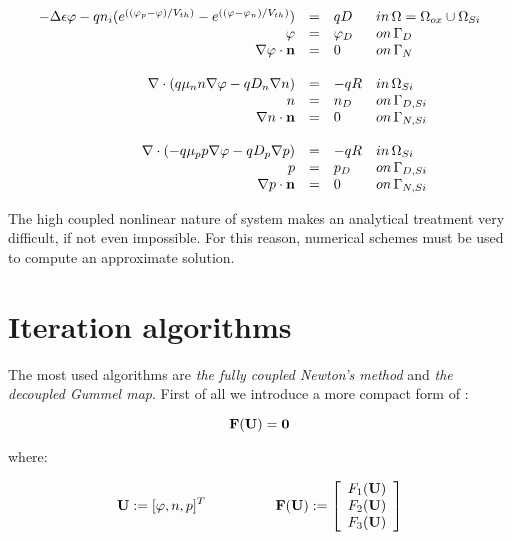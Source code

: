 \begin{equation}
\label{eq: system closed}
\begin{array}{rcll}
- \Delta \epsilon \varphi - qn_i(e^{((\varphi_p-\varphi)/V_{th})}-e^{((\varphi-\varphi_n)/V_{th})}) & =  & qD & in \, \Omega = \Omega_{ox} \cup \Omega_{Si}\\
\varphi & = & \varphi_D & on \, \Gamma_D \\
\nabla \varphi \cdot \mathbf{n} & = & 0 & on \, \Gamma_N 
\\
\\
\nabla \cdot ( q\mu_n n \nabla \varphi - qD_n \nabla n ) & = & - qR & in \, \Omega_{Si}\\
n & = & n_D & on \, \Gamma_{D,Si} \\
\nabla n \cdot \mathbf{n} & = & 0 & on \, \Gamma_{N,Si}
\\
\\
\nabla \cdot (- q\mu_p p \nabla \varphi - qD_p \nabla p )& = & -qR& in \, \Omega_{Si}\\
p & = & p_D & on \, \Gamma_{D,Si} \\
\nabla p \cdot \mathbf{n} & = & 0 & on \, \Gamma_{N,Si}
\end{array}
\end{equation}

The high coupled nonlinear nature of system	 makes an analytical treatment very difficult, if not even impossible. For this reason, numerical schemes must be used to compute an approximate solution. 


\section{Iteration algorithms}

 The most used algorithms are \textit{the fully coupled Newton's method} and \textit{the decoupled Gummel map}. First of all we introduce a more compact form of :

\begin{equation}
\label{eq: abstract problem fully}
\mathbf{F(U)}=\mathbf{0}
\end{equation}

where:

\begin{equation}
\vect{U}:=[\varphi,n,p]^T \psp{30} \vect{F(U)}:=\left[ \begin{array}{c}
F_1(\vect{U}) \\
F_2(\vect{U}) \\
F_3(\vect{U})
\end{array}
\right]
\end{equation}

